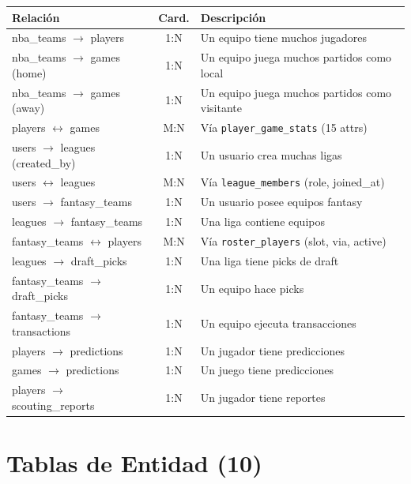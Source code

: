 \documentclass[12pt,a4paper]{article}
\begin{document}
\begin{longtable}{p{6cm} c p{6.5cm}}
\toprule
\textbf{Relaci\'on} & \textbf{Card.} & \textbf{Descripci\'on} \\
\midrule
\endhead
nba\_teams $\to$ players & 1:N & Un equipo tiene muchos jugadores \\
nba\_teams $\to$ games (home) & 1:N & Un equipo juega muchos partidos como local \\
nba\_teams $\to$ games (away) & 1:N & Un equipo juega muchos partidos como visitante \\
players $\leftrightarrow$ games & M:N & V\'ia \texttt{player\_game\_stats} (15 attrs) \\
users $\to$ leagues (created\_by) & 1:N & Un usuario crea muchas ligas \\
users $\leftrightarrow$ leagues & M:N & V\'ia \texttt{league\_members} (role, joined\_at) \\
users $\to$ fantasy\_teams & 1:N & Un usuario posee equipos fantasy \\
leagues $\to$ fantasy\_teams & 1:N & Una liga contiene equipos \\
fantasy\_teams $\leftrightarrow$ players & M:N & V\'ia \texttt{roster\_players} (slot, via, active) \\
leagues $\to$ draft\_picks & 1:N & Una liga tiene picks de draft \\
fantasy\_teams $\to$ draft\_picks & 1:N & Un equipo hace picks \\
fantasy\_teams $\to$ transactions & 1:N & Un equipo ejecuta transacciones \\
players $\to$ predictions & 1:N & Un jugador tiene predicciones \\
games $\to$ predictions & 1:N & Un juego tiene predicciones \\
players $\to$ scouting\_reports & 1:N & Un jugador tiene reportes \\
\bottomrule
\end{longtable}

\section{Tablas de Entidad (10)}
\end{document}
